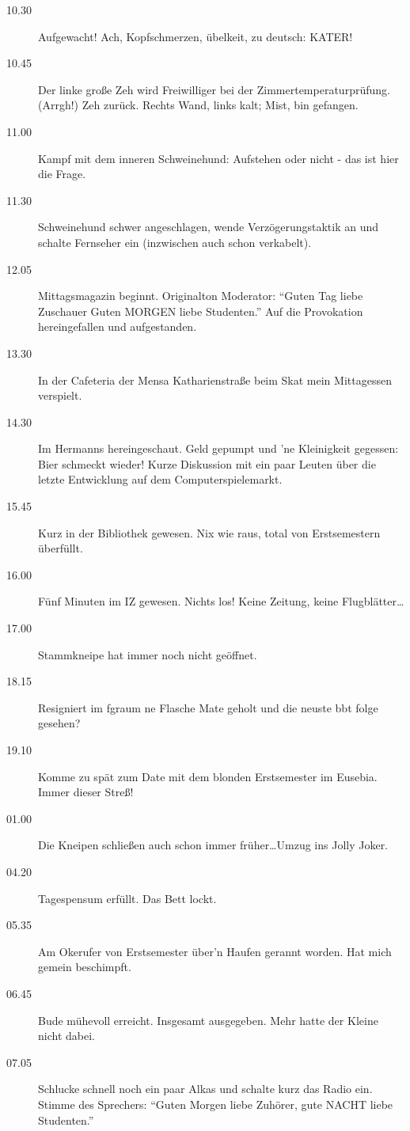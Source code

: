 \begin{description}
\item[10.30] Aufgewacht! Ach, Kopfschmerzen, übelkeit, zu deutsch: KATER!
\item[10.45] Der linke große Zeh wird Freiwilliger bei der Zimmertemperaturprüfung.
(Arrgh!) Zeh zurück. Rechts Wand, links kalt; Mist, bin gefangen.
\item[11.00] Kampf mit dem inneren Schweinehund: Aufstehen oder nicht - das ist
hier die Frage.
\item[11.30] Schweinehund schwer angeschlagen, wende Verzögerungstaktik an und
schalte Fernseher ein (inzwischen auch schon verkabelt).
\item[12.05] Mittagsmagazin beginnt. Originalton Moderator: "`Guten Tag liebe
Zuschauer Guten MORGEN liebe Studenten."' Auf die Provokation hereingefallen
und aufgestanden.
\item[13.30] In der Cafeteria der Mensa Katharienstraße beim Skat mein Mittagessen
verspielt.
\item[14.30] Im Hermanns hereingeschaut. Geld gepumpt und 'ne Kleinigkeit
gegessen: Bier schmeckt wieder! Kurze Diskussion mit ein paar Leuten über
die letzte Entwicklung auf dem Computerspielemarkt.
\item[15.45] Kurz in der Bibliothek gewesen. Nix wie raus, total von Erstsemestern
überfüllt.
\item[16.00] Fünf Minuten im IZ gewesen. Nichts los! Keine Zeitung, keine
Flugblätter\ldots
\item[17.00] Stammkneipe hat immer noch nicht geöffnet.
\item[18.15] Resigniert im fgraum ne Flasche Mate geholt und die neuste bbt folge gesehen?
\item[19.10] Komme zu spät zum Date mit dem blonden Erstsemester im Eusebia.
Immer dieser Streß!
\item[01.00] Die Kneipen schließen auch schon immer früher\ldots Umzug ins Jolly Joker.
\item[04.20] Tagespensum erfüllt. Das Bett lockt.
\item[05.35] Am Okerufer von Erstsemester über'n Haufen gerannt worden. Hat mich
gemein beschimpft.
\item[06.45] Bude mühevoll erreicht. Insgesamt  ausgegeben. Mehr hatte der
Kleine nicht dabei.
\item[07.05] Schlucke schnell noch ein paar Alkas und schalte kurz das Radio ein.
Stimme des Sprechers: "`Guten Morgen liebe Zuhörer, gute NACHT liebe
Studenten."'
\end{description}
